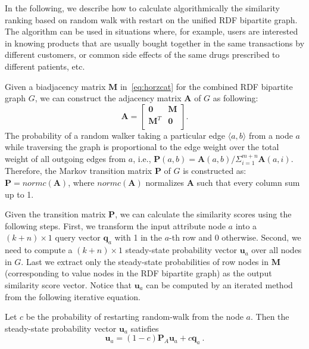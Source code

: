 In the following, we describe how to calculate algorithmically the similarity ranking based on random walk with restart on the unified RDF bipartite graph. The algorithm can be used in situations where, for example, users are interested in knowing products that are usually bought together in the same transactions by different customers, or common side effects of the same drugs prescribed to different patients, etc.

Given a biadjacency matrix $\mathbf{M}$ in~\ref{eq:horzcat} for the combined RDF bipartite graph $G$, we can construct the adjacency matrix $\mathbf{A}$ of $G$ as following:
\[
\mathbf{A}=\left[
               \begin{array}{cc}
                 \mathbf{0}   & \mathbf{M} \\
                 \mathbf{M}^T & \mathbf{0} \\
               \end{array}
             \right].
\]
The probability of a random walker taking a particular edge $\langle a,b\rangle$ from a node $a$ while traversing the graph is proportional to the edge weight over the total weight of all outgoing edges from $a$, i.e., $\mathbf{P}(a,b)=\mathbf{A}(a,b)/\Sigma_{i=1}^{m+n}\mathbf{A}(a,i)$. Therefore, the Markov transition matrix $\mathbf{P}$ of $G$ is constructed as: $\mathbf{P}=normc(\mathbf{A})$, where $normc(\mathbf{A})$ normalizes $\mathbf{A}$ such that every column sum up to 1.

Given the transition matrix $\mathbf{P}$, we can calculate the similarity scores using the following steps. First, we transform the input attribute node $a$ into a $(k+n) \times 1$ query vector $\mathbf{q}_a$ with 1 in the $a$-th row and 0 otherwise. Second, we need to compute a $(k+n)\times 1$ steady-state probability vector $\mathbf{u}_a$ over all nodes in $G$. Last we extract only the steady-state probabilities of row nodes in $\mathbf{M}$ (corresponding to value nodes in the RDF bipartite graph) as the output similarity score vector. Notice that $\mathbf{u}_a$ can be computed by an iterated method from the following iterative equation.

Let $c$ be the probability of restarting random-walk from the node $a$. Then the steady-state probability vector $\mathbf{u}_a$ satisfies
\begin{equation}
\label{eq:steady-state}
\mathbf{u}_a=(1-c)\mathbf{P}_A\mathbf{u}_a+c\mathbf{q}_a~.
\end{equation}

